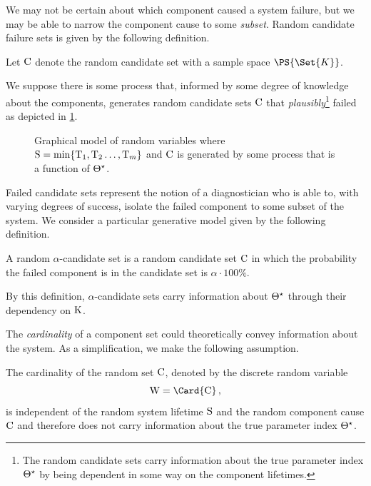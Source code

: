 \documentclass[../main.tex]{subfiles}
\begin{document}
We may not be certain about which component caused a system failure, but we may be able to narrow the component cause to some \emph{subset}.
Random candidate failure sets is given by the following definition.
\begin{definition}
\label{def:random_candidate_set}
Let $\mathrm{C}$ denote the random candidate set with a sample space $\PS{\Set{K}}$.
\end{definition}

We suppose there is some process that, informed by some degree of knowledge about the components, generates random candidate sets $\mathrm{C}$ that \emph{plausibly}\footnote{The random candidate sets carry information about the true parameter index ${\Theta}^{\star}$ by being dependent in some way on the component lifetimes.} failed as depicted in \cref{fig:gen_model}.
\begin{figure}
	\caption{Graphical model of random variables where $\mathrm{S} = \min\{\mathrm{T}_1,\mathrm{T}_2\ldots,\mathrm{T}_m\}$ and $\mathrm{C}$ is generated by some process that is a function of ${\Theta}^{\star}$.}
	\label{fig:gen_model}
	\begin{center}
		
	\end{center}
\end{figure}

Failed candidate sets represent the notion of a diagnostician who is able to, with varying degrees of success, isolate the failed component to some subset of the system.
We consider a particular generative model given by the following definition.
\begin{definition}
A random $\alpha$-candidate set is a random candidate set $\mathrm{C}$ in which the probability the failed component is in the candidate set is $\alpha \cdot 100 \%$.
\end{definition}
By this definition, $\alpha$-candidate sets carry information about ${\Theta}^{\star}$ through their dependency on $\mathrm{K}$.

The \emph{cardinality} of a component set could theoretically convey information about the system.
As a simplification, we make the following assumption.
\begin{assumption}
	\label{asm:indep_W_S}
	The cardinality of the random set $\mathrm{C}$, denoted by the discrete random variable
	\begin{equation}
	\RV{W} = \Card{\rvcand}\,,
	\end{equation}
	is independent of the random system lifetime $\mathrm{S}$ and the random component 
	cause $\mathrm{C}$ and therefore does not carry information about the true 
	parameter index ${\Theta}^{\star}$.
\end{assumption}
\end{document}
